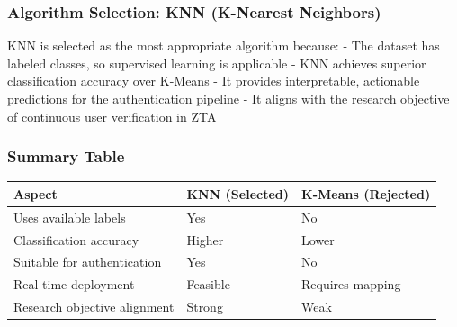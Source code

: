 \documentclass[11pt]{article}
\newcounter{none}
\begin{document}
\subsubsection{Algorithm Selection: KNN (K-Nearest
Neighbors)}\label{algorithm-selection-knn-k-nearest-neighbors}

KNN is selected as the most appropriate algorithm because: - The dataset
has labeled classes, so supervised learning is applicable - KNN achieves
superior classification accuracy over K-Means - It provides
interpretable, actionable predictions for the authentication pipeline -
It aligns with the research objective of continuous user verification in
ZTA

\subsubsection{Summary Table}\label{summary-table}

{\def\LTcaptype{none} %
\begin{longtable}[]{@{}lll@{}}
\toprule\noalign{}
Aspect & KNN (Selected) & K-Means (Rejected) \\
\midrule\noalign{}
\endhead
\bottomrule\noalign{}
\endlastfoot
Uses available labels & Yes & No \\
Classification accuracy & Higher & Lower \\
Suitable for authentication & Yes & No \\
Real-time deployment & Feasible & Requires mapping \\
Research objective alignment & Strong & Weak \\
\end{longtable}
}


    
    
    
\end{document}
